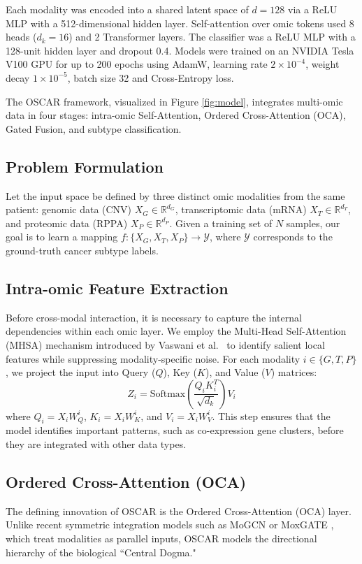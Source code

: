 \documentclass[lettersize,journal]{IEEEtran}
\begin{document}
Each modality was encoded into a shared latent space of $d=128$ via a ReLU MLP with a 512-dimensional hidden layer. Self-attention over omic tokens used 8 heads ($d_k=16$) and 2 Transformer layers. The classifier was a ReLU MLP with a 128-unit hidden layer and dropout 0.4. Models were trained on an NVIDIA Tesla V100 GPU for up to 200 epochs using AdamW, learning rate $2 \times 10^{-4}$, weight decay $1 \times 10^{-5}$, batch size 32 and Cross-Entropy loss.

The OSCAR framework, visualized in Figure \ref{fig:model}, integrates multi-omic data in four stages: intra-omic Self-Attention, Ordered Cross-Attention (OCA), Gated Fusion, and subtype classification.

\subsection{Problem Formulation}
Let the input space be defined by three distinct omic modalities from the same patient: genomic data (CNV) $X_{G} \in \mathbb{R}^{d_G}$, transcriptomic data (mRNA) $X_{T} \in \mathbb{R}^{d_T}$, and proteomic data (RPPA) $X_{P} \in \mathbb{R}^{d_P}$. Given a training set of $N$ samples, our goal is to learn a mapping $f: \{X_G, X_T, X_P\} \rightarrow \mathcal{Y}$, where $\mathcal{Y}$ corresponds to the ground-truth cancer subtype labels.

\subsection{Intra-omic Feature Extraction}
Before cross-modal interaction, it is necessary to capture the internal dependencies within each omic layer. We employ the Multi-Head Self-Attention (MHSA) mechanism introduced by Vaswani et al.~\cite{Vaswani2017Attention} to identify salient local features while suppressing modality-specific noise. For each modality $i \in \{G, T, P\}$, we project the input into Query ($Q$), Key ($K$), and Value ($V$) matrices:
\begin{equation}
    Z_i = \text{Softmax}\left(\frac{Q_i K_i^T}{\sqrt{d_k}}\right) V_i
\end{equation}
where $Q_i = X_i W_Q^i$, $K_i = X_i W_K^i$, and $V_i = X_i W_V^i$. This step ensures that the model identifies important patterns, such as co-expression gene clusters, before they are integrated with other data types.

\subsection{Ordered Cross-Attention (OCA)}
The defining innovation of OSCAR is the Ordered Cross-Attention (OCA) layer. Unlike recent symmetric integration models such as MoGCN \cite{MoGCN2022} or MoxGATE \cite{MoxGATE2023}, which treat modalities as parallel inputs, OSCAR models the directional hierarchy of the biological ``Central Dogma."
\end{document}
